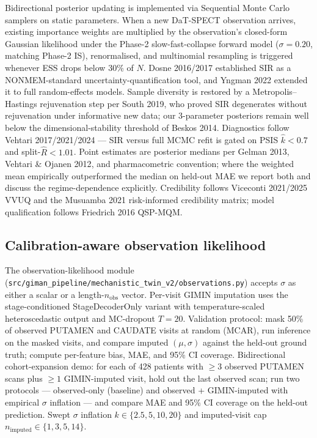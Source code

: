 Bidirectional posterior updating is implemented via Sequential Monte Carlo samplers on static parameters\cite{chopin2002sequential,delmoral2006smc,chopin2020introduction}. When a new DaT-SPECT observation arrives, existing importance weights are multiplied by the observation's closed-form Gaussian likelihood under the Phase-2 slow-fast-collapse forward model ($\sigma = 0.20$, matching Phase-2 IS), renormalised, and multinomial resampling is triggered whenever ESS drops below 30\% of $N$\cite{kong1994sequential}. Dosne 2016/2017\cite{dosne2016sir,dosne2017automated} established SIR as a NONMEM-standard uncertainty-quantification tool, and Yngman 2022\cite{yngman2022fullrandom} extended it to full random-effects models. Sample diversity is restored by a Metropolis--Hastings rejuvenation step per South 2019\cite{south2019smc}, who proved SIR degenerates without rejuvenation under informative new data; our 3-parameter posteriors remain well below the dimensional-stability threshold of Beskos 2014\cite{beskos2014stability}. Diagnostics follow Vehtari 2017/2021/2024\cite{vehtari2017practical,vehtari2024psis,vehtari2021rhat} --- SIR versus full MCMC refit is gated on PSIS $\hat{k} < 0.7$ and split-$\hat{R} < 1.01$. Point estimates are posterior medians per Gelman 2013\cite{gelman2013bda3}, Vehtari \& Ojanen 2012\cite{vehtari2012survey}, and pharmacometric convention\cite{mould2013basic2,mould2014basic3}; where the weighted mean empirically outperformed the median on held-out MAE we report both and discuss the regime-dependence explicitly. Credibility follows Viceconti 2021/2025\cite{viceconti2021insilico,viceconti2025credibilityml} VVUQ and the Musuamba 2021\cite{musuamba2021credibility} risk-informed credibility matrix; model qualification follows Friedrich 2016\cite{friedrich2016mqm} QSP-MQM.

\subsection{Calibration-aware observation likelihood}

The observation-likelihood module (\texttt{src/giman\_pipeline/mechanistic\_twin\_v2/observations.py}) accepts $\sigma$ as either a scalar or a length-$n_\text{obs}$ vector. Per-visit GIMIN imputation uses the stage-conditioned StageDecoderOnly variant\cite{dupre2026paper2} with temperature-scaled heteroscedastic output and MC-dropout $T = 20$. Validation protocol: mask 50\% of observed PUTAMEN and CAUDATE visits at random (MCAR), run inference on the masked visits, and compare imputed $(\mu, \sigma)$ against the held-out ground truth; compute per-feature bias, MAE, and 95\% CI coverage. Bidirectional cohort-expansion demo: for each of 428 patients with $\geq 3$ observed PUTAMEN scans plus $\geq 1$ GIMIN-imputed visit, hold out the last observed scan; run two protocols --- observed-only (baseline) and observed + GIMIN-imputed with empirical $\sigma$ inflation --- and compare MAE and 95\% CI coverage on the held-out prediction. Swept $\sigma$ inflation $k \in \{2.5, 5, 10, 20\}$ and imputed-visit cap $n_\text{imputed} \in \{1, 3, 5, 14\}$.

